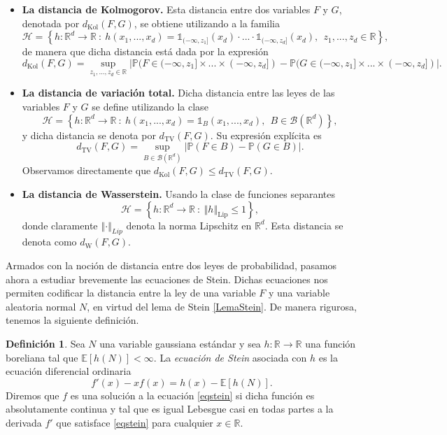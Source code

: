 \documentclass[letterpaper,twoside,12pt]{book}
\newcommand{\R}{\mathbb{R}}
\newcommand{\B}{\mathcal{B}}
\newcommand{\E}{\mathbb{E}}
\renewcommand{\P}{\mathbb{P}}
\newcommand{\1}{\mathds{1}}
\newcommand{\abs}[1]{\left\lvert #1 \right\rvert}
\renewcommand{\to}{\rightarrow}
\newcommand{\norm}[1]{\left\Vert #1 \right\Vert}
\theoremstyle{definition}
\newtheorem{dfn}{Definición}
\theoremstyle{definition}
\theoremstyle{remark}
\theoremstyle{definition}
\theoremstyle{definition}
\theoremstyle{definition}
\theoremstyle{definition}
\theoremstyle{definition}
\begin{document}
\begin{itemize}
   \item \textbf{La distancia de Kolmogorov.} Esta distancia entre dos variables $F$ y $G$, denotada por $d_{\text{Kol}}(F,G)$, se obtiene utilizando a la familia \[\mathscr{H}= \left\{h:\R^d\to \R \ :\ h(x_1,...,x_d)=\1_{(-\infty,z_1]}(x_d)\cdot ... \cdot \1_{(-\infty,z_d]}(x_d), \ \  z_1,...,z_d\in \R\right\},\]
   de manera que dicha distancia está dada por la expresión
   \[
   d_{\text{Kol}}(F,G)=\sup_{z_1,...,z_d\in \R}\abs{\P(F\in (-\infty,z_1]\times...\times(-\infty,z_d])-\P(G\in (-\infty,z_1]\times...\times(-\infty,z_d])}.
   \]
   \item \textbf{La distancia de variación total.} Dicha distancia entre las leyes de las variables $F$ y $G$ se define utilizando la clase \[\mathscr{H}=\left\{h:\R^d\to \R \ :\ h(x_1,...,x_d)=\1_B(x_1,...,x_d), \ \ B\in \B(\R^{d})\right\},\] 
   y dicha distancia se denota por $d_{\text{TV}}(F,G).$ Su expresión explícita es 
   \[
      d_{\text{TV}}(F,G)= \sup_{B\in \B(\R^{d})}\abs{\P(F\in B)-\P(G\in B)}.
   \]
   Observamos directamente que $d_{\text{Kol}}(F,G)\leq d_{\text{TV}}(F,G)$.
   \item \textbf{La distancia de Wasserstein.} Usando la clase de funciones separantes \[\mathscr{H}=\left\{h:\R^{d}\to \R \ :\ \norm{h}_{\text{Lip}}\leq 1\right\},\] donde claramente $\norm{\cdot}_{Lip}$ denota la norma Lipschitz en $\R^{d}$. Esta distancia se denota como $d_{\text{W}}(F,G)$.
\end{itemize}

Armados con la noción de distancia entre dos leyes de probabilidad, pasamos ahora a estudiar brevemente las ecuaciones de Stein. Dichas ecuaciones nos permiten codificar la distancia entre la ley de una variable $F$ y una variable aleatoria normal $N$, en virtud del lema de Stein \ref{LemaStein}. De manera rigurosa, tenemos la siguiente definición.

\begin{dfn} 
 Sea $N$ una variable gaussiana estándar y sea $h:\R\to\R$ una función boreliana tal que $\E\left[h(N)\right]<\infty$. La \textit{ecuación de Stein} asociada con $h$ es la ecuación diferencial ordinaria 
 \begin{equation}\label{eqstein}
   f'(x)-xf(x)=h(x)-\E\left[h(N)\right].
 \end{equation}
 Diremos que $f$ es una solución a la ecuación \eqref{eqstein} si dicha función es absolutamente continua y tal que es igual Lebesgue casi en todas partes a la derivada $f'$ que satisface \eqref{eqstein} para cualquier $x\in \R$.
 \end{dfn}
\end{document}
